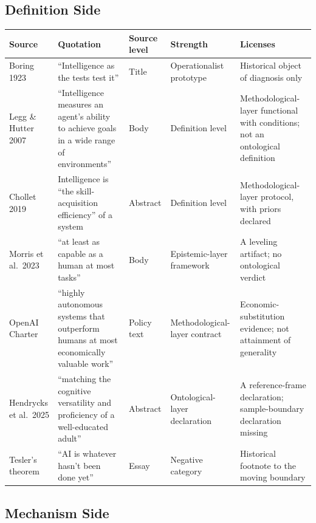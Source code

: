 \documentclass[10pt]{article}
\begin{document}
\subsection{Definition Side}

\begin{longtable}{p{3.4cm} p{4.6cm} p{1.6cm} p{1.6cm} p{3.4cm}}
\toprule
Source & Quotation & Source level & Strength & Licenses \\
\midrule
\endhead
Boring 1923\cite{boring1923intelligence} & ``Intelligence as the tests test it'' & Title & Operationalist prototype & Historical object of diagnosis only \\
Legg \& Hutter 2007\cite{legg2007universal} & ``Intelligence measures an agent's ability to achieve goals in a wide range of environments'' & Body & Definition level & Methodological-layer functional with conditions; not an ontological definition \\
Chollet 2019\cite{chollet2019measure} & Intelligence is ``the skill-acquisition efficiency'' of a system & Abstract & Definition level & Methodological-layer protocol, with priors declared \\
Morris et al.\ 2023\cite{morris2023levels} & ``at least as capable as a human at most tasks'' & Body & Epistemic-layer framework & A leveling artifact; no ontological verdict \\
OpenAI Charter\cite{openai2018charter} & ``highly autonomous systems that outperform humans at most economically valuable work'' & Policy text & Methodological-layer contract & Economic-substitution evidence; not attainment of generality \\
Hendrycks et al.\ 2025\cite{hendrycks2025definition} & ``matching the cognitive versatility and proficiency of a well-educated adult'' & Abstract & Ontological-layer declaration & A reference-frame declaration; sample-boundary declaration missing \\
Tesler's theorem\cite{tesler1997effect} & ``AI is whatever hasn't been done yet'' & Essay & Negative category & Historical footnote to the moving boundary \\
\bottomrule
\end{longtable}

\subsection{Mechanism Side}
\end{document}
